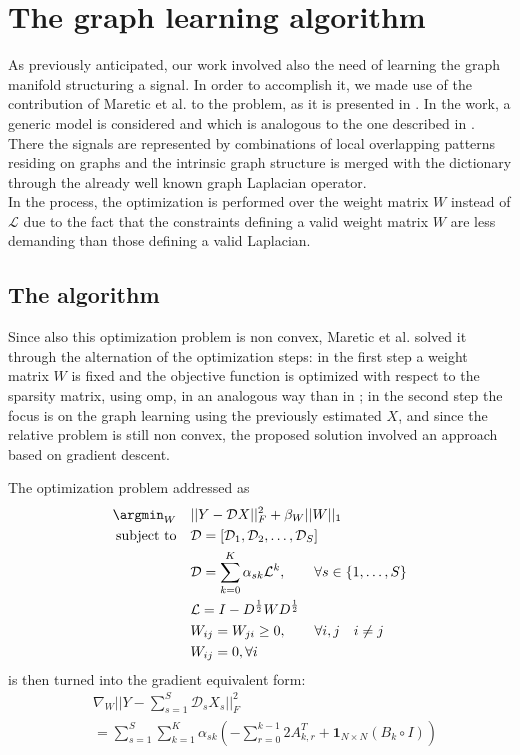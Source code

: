 \chapter{The graph learning algorithm}
As previously anticipated, our work involved also the need of learning the graph manifold structuring a signal. In order to accomplish it, we made use of the contribution of Maretic et al. to the problem, as it is presented in \cite{Maretic2017}. In the work, a generic model is considered and which is analogous to the one described in \cite {Thanou2014}. There the signals are represented by combinations of local overlapping patterns residing on graphs and the intrinsic graph structure is merged with the dictionary through the already well known graph Laplacian operator.\\
In the process, the optimization is performed over the weight matrix $W$ instead of $\mathcal{L}$ due to the fact that the constraints defining a valid weight matrix $W$ are less demanding than those defining a valid Laplacian.

\section{The algorithm}
Since also this optimization problem is non convex, Maretic et al. solved it through the alternation of the optimization steps: in the first step a weight matrix $W$ is fixed and the objective function is optimized with respect to the sparsity matrix, using \gls{omp}, in an analogous way than in \cite{Thanou2014}; in the second step the focus is on the graph learning using the previously estimated $X$, and since the relative problem is still non convex, the proposed solution involved an approach based on gradient descent.

The optimization problem addressed as
\begin{align}
\argmin_W \quad &||Y - \mathcal{D}X||_F^2 + \beta_W ||W||_1\\
\text{subject to} \quad &\mathcal{D} = [\mathcal{D}_1,\mathcal{D}_2,\dots,\mathcal{D}_S]\\
                        &\mathcal{D} = \sum_{k=0}^{K}\alpha_{sk}\mathcal{L}^k, \qquad \forall s \in \{1,\dots,S\}\\
                        &\mathcal{L} = I - D^{\frac{1}{2}}WD^{\frac{1}{2}}\\
                        &W_{ij} = W_{ji} \geq 0, \qquad \forall i,j \quad i \ne j\\
                        &W_{ij} = 0, \forall i
\end{align}
is then turned into the gradient equivalent form:
\begin{equation}
\begin{split}
&\nabla_W ||Y - \sum_{s=1}^{S}\mathcal{D}_s X_s||_F^2\\
&= \sum_{s=1}^S \sum_{k=1}^K \alpha_{sk} (- \sum_{r = 0}^{k-1}2A^T_{k,r}+\textbf{1}_{N\times N}(B_k \circ I))
\end{split}
\end{equation}

